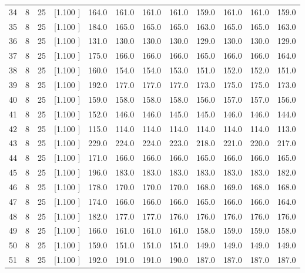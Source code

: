 \documentclass[12pt,a4paper]{article}
\begin{document}
\begin{center}
{\begin{tabular}{r r r r r r r r r r r r}
  34&  8& 25&[1.100     ]&   164.0&   161.0&   161.0&   161.0&   159.0&   161.0&   161.0&   159.0\\[-0.02in]
  35&  8& 25&[1.100     ]&   184.0&   165.0&   165.0&   165.0&   163.0&   165.0&   165.0&   163.0\\[-0.02in]
  36&  8& 25&[1.100     ]&   131.0&   130.0&   130.0&   130.0&   129.0&   130.0&   130.0&   129.0\\[-0.02in]
  37&  8& 25&[1.100     ]&   175.0&   166.0&   166.0&   166.0&   165.0&   166.0&   166.0&   164.0\\[-0.02in]
  38&  8& 25&[1.100     ]&   160.0&   154.0&   154.0&   153.0&   151.0&   152.0&   152.0&   151.0\\[-0.02in]
  39&  8& 25&[1.100     ]&   192.0&   177.0&   177.0&   177.0&   173.0&   175.0&   175.0&   173.0\\[-0.02in]
  40&  8& 25&[1.100     ]&   159.0&   158.0&   158.0&   158.0&   156.0&   157.0&   157.0&   156.0\\[-0.02in]
  41&  8& 25&[1.100     ]&   152.0&   146.0&   146.0&   145.0&   145.0&   146.0&   146.0&   144.0\\[-0.02in]
  42&  8& 25&[1.100     ]&   115.0&   114.0&   114.0&   114.0&   114.0&   114.0&   114.0&   113.0\\[-0.02in]
  43&  8& 25&[1.100     ]&   229.0&   224.0&   224.0&   223.0&   218.0&   221.0&   220.0&   217.0\\[-0.02in]
  44&  8& 25&[1.100     ]&   171.0&   166.0&   166.0&   166.0&   165.0&   166.0&   166.0&   165.0\\[-0.02in]
  45&  8& 25&[1.100     ]&   196.0&   183.0&   183.0&   183.0&   183.0&   183.0&   183.0&   182.0\\[-0.02in]
  46&  8& 25&[1.100     ]&   178.0&   170.0&   170.0&   170.0&   168.0&   169.0&   168.0&   168.0\\[-0.02in]
  47&  8& 25&[1.100     ]&   174.0&   166.0&   166.0&   166.0&   165.0&   166.0&   166.0&   164.0\\[-0.02in]
  48&  8& 25&[1.100     ]&   182.0&   177.0&   177.0&   176.0&   176.0&   176.0&   176.0&   176.0\\[-0.02in]
  49&  8& 25&[1.100     ]&   166.0&   161.0&   161.0&   161.0&   158.0&   159.0&   159.0&   158.0\\[-0.02in]
  50&  8& 25&[1.100     ]&   159.0&   151.0&   151.0&   151.0&   149.0&   149.0&   149.0&   149.0\\[-0.02in]
  51&  8& 25&[1.100     ]&   192.0&   191.0&   191.0&   190.0&   187.0&   187.0&   187.0&   187.0\\[-0.02in]

\end{tabular}}
\end{center}
\end{document}

